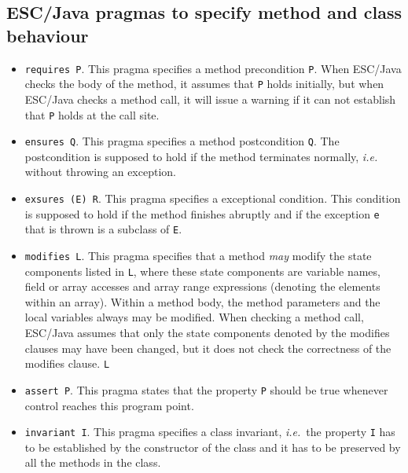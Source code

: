 \documentclass[a4paper]{llncs}
\begin{document}
\subsection{ESC/Java pragmas to specify method and class behaviour}
\begin{itemize}
\item{\texttt{requires P}.}
This pragma specifies a method precondition {\tt P}.
When ESC/Ja\-va checks the body of the
method, it assumes that \texttt{P} holds initially, but when
ESC/Java checks a method call, it will issue a warning if
it can not establish that \texttt{P} holds at the call site.

\item{\texttt{ensures Q}.}
This pragma specifies a method postcondition \texttt{Q}. The
postcondition is supposed to hold if the method terminates normally,
\emph{i.e.}  without throwing an exception.

\item{\texttt{exsures (E) R}.}
This pragma specifies a exceptional condition. This condition is
supposed to hold if the method finishes abruptly and if
the exception \texttt{e} that is thrown is a subclass of \texttt{E}.

\item{\texttt{modifies L}.}
This pragma specifies that a method \emph{may} modify the state
components listed in \texttt{L}, where these state components are
variable names, field or array accesses and array range expressions
(denoting the elements within an array). Within a method body, the
method parameters and the local variables always may be modified. When
checking a method call, ESC/Java assumes that only the state
components denoted by the modifies clauses may have been changed, but it
does not check the correctness of the modifies clause.
\texttt{L}

\item{\texttt{assert P}.} This pragma states that the property
\texttt{P} should be true whenever control reaches this program point.

\item{\texttt{invariant I}.} This pragma specifies a class invariant,
\emph{i.e.}~the property \texttt{I} has to be established by the
constructor of the class and it has to be preserved by all the
methods in the class. 
\end{itemize}
\end{document}
